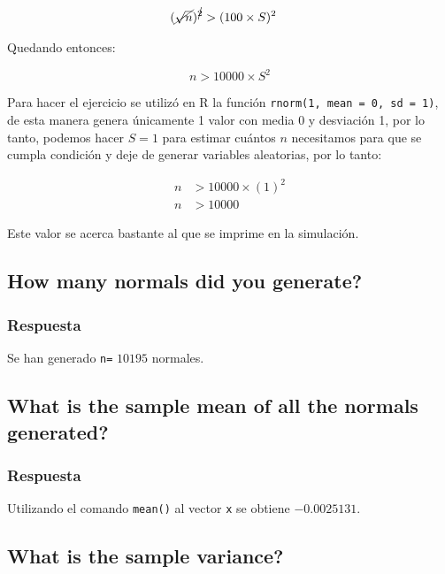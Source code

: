 \documentclass[12pt]{article}\usepackage[]{graphicx}\usepackage[]{xcolor}
\begin{document}
\begin{align*}
  (\cancel{\sqrt{n}})^{\cancel{2}} &> (100 \times S)^{2} 
\end{align*}

Quedando entonces:

\[
n > 10000\times S^{2}
\]

Para hacer el ejercicio se utilizó en \textsf{R} la función \texttt{rnorm(1, mean = 0, sd = 1)}, de esta manera genera únicamente 1 valor con media 0 y desviación 1, por lo tanto, podemos hacer $S = 1$ para estimar cuántos $n$ necesitamos para que se cumpla condición y deje de generar variables aleatorias, por lo tanto:

\begin{align*}
  n &> 10000 \times (1)^{2} \\
  n &> 10000 
\end{align*}

Este valor se acerca bastante al que se imprime en la simulación. 











\subsection{How many normals did you generate?}
\label{subsec:p1-b}

\subsubsection{Respuesta}

Se han generado \lstinline|n=| $10195$ normales.


\subsection{What is the sample mean of all the normals generated?}
\label{subsec:p1-c}




\subsubsection{Respuesta}

Utilizando el comando \lstinline|mean()| al vector \lstinline|x| se obtiene $-0.0025131$. 

\subsection{What is the sample variance?}
\label{subsec:p1-d}
\end{document}
